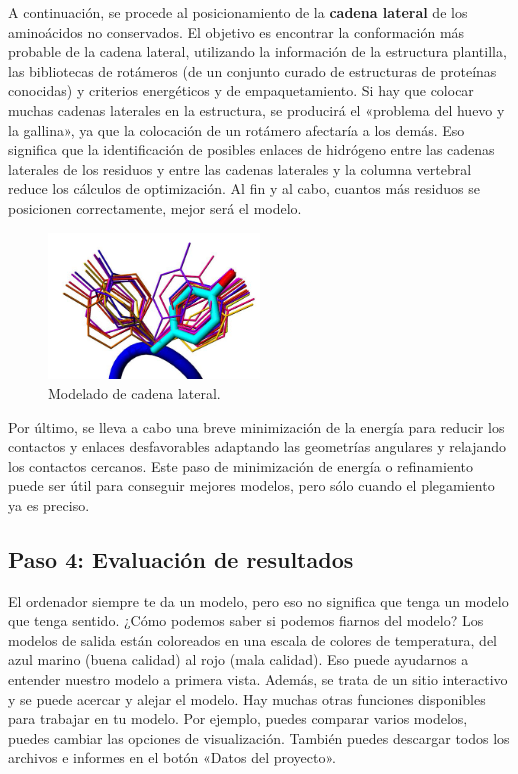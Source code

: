A continuación, se procede al posicionamiento de la \textbf{cadena lateral} de los aminoácidos no conservados. El objetivo es encontrar la conformación más probable de la cadena lateral, utilizando la información de la estructura plantilla, las bibliotecas de rotámeros (de un conjunto curado de estructuras de proteínas conocidas) y criterios energéticos y de empaquetamiento. Si hay que colocar muchas cadenas laterales en la estructura, se producirá el «problema del huevo y la gallina», ya que la colocación de un rotámero afectaría a los demás. Eso significa que la identificación de posibles enlaces de hidrógeno entre las cadenas laterales de los residuos y entre las cadenas laterales y la columna vertebral reduce los cálculos de optimización. Al fin y al cabo, cuantos más residuos se posicionen correctamente, mejor será el modelo.

\begin{figure}[h]
\centering
\includegraphics[width = 0.5\textwidth]{figs/Rotamers.png}
\caption{Modelado de cadena lateral.}
\end{figure}

Por último, se lleva a cabo una breve minimización de la energía para reducir los contactos y enlaces desfavorables adaptando las geometrías angulares y relajando los contactos cercanos. Este paso de minimización de energía o refinamiento puede ser útil para conseguir mejores modelos, pero sólo cuando el plegamiento ya es preciso.

\subsection{Paso 4: Evaluación de resultados}
El ordenador siempre te da un modelo, pero eso no significa que tenga un modelo que tenga sentido. ¿Cómo podemos saber si podemos fiarnos del modelo? Los modelos de salida están coloreados en una escala de colores de temperatura, del azul marino (buena calidad) al rojo (mala calidad). Eso puede ayudarnos a entender nuestro modelo a primera vista. Además, se trata de un sitio interactivo y se puede acercar y alejar el modelo. Hay muchas otras funciones disponibles para trabajar en tu modelo. Por ejemplo, puedes comparar varios modelos, puedes cambiar las opciones de visualización. También puedes descargar todos los archivos e informes en el botón «Datos del proyecto».

